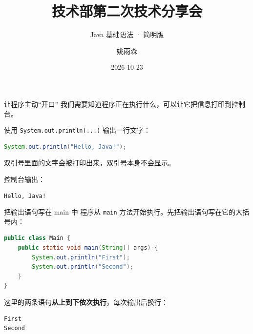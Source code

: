 \documentclass[aspectratio=169]{beamer}
\title[技术部第二次分享]{技术部第二次技术分享会}
\subtitle{Java 基础语法 · 简明版}
\author{姚雨森}
\institute{技术部 分管主席}
\date{2026-10-23}
\begin{document}
\maketitle


\begin{frame}[fragile]{让程序主动“开口”}
  我们需要知道程序正在执行什么，可以让它把信息打印到控制台。
  \par\medskip
  使用 \texttt{System.out.println(...)} 输出一行文字：
  \begin{lstlisting}[language=Java]
System.out.println("Hello, Java!");
  \end{lstlisting}
  双引号里面的文字会被打印出来，双引号本身不会显示。
  \par\medskip
  控制台输出：
  \begin{lstlisting}[language={}]
Hello, Java!
  \end{lstlisting}
\end{frame}

\begin{frame}[fragile]{把输出语句写在 main 中}
  程序从 \texttt{main} 方法开始执行。先把输出语句写在它的大括号内：
  \begin{lstlisting}[language=Java]
public class Main {
    public static void main(String[] args) {
        System.out.println("First");
        System.out.println("Second");
    }
}
  \end{lstlisting}
  这里的两条语句\textbf{从上到下依次执行}，每次输出后换行：
  \begin{lstlisting}[language={}]
First
Second
  \end{lstlisting}
\end{frame}
\end{document}

